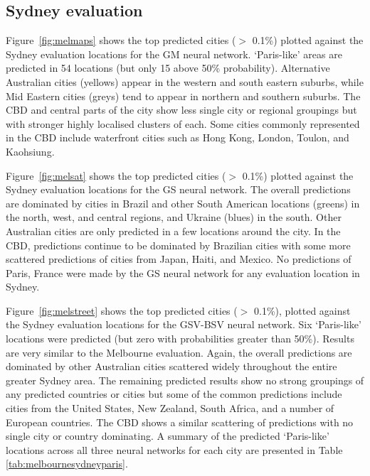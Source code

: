 \documentclass[Crown,sageh,times]{sagej}
\begin{document}
\subsection{Sydney evaluation} 

Figure~\ref{fig:melmaps} shows the top predicted cities ($>$ 0.1\%) plotted against the Sydney evaluation locations for the GM neural network. `Paris-like' areas are predicted in 54 locations (but only 15 above 50\% probability).  Alternative Australian cities (yellows) appear in the western and south eastern suburbs, while Mid Eastern cities (greys) tend to appear in northern and southern suburbs. The CBD and central parts of the city show less single city or regional groupings but with stronger highly localised clusters of each. Some cities commonly represented in the CBD include waterfront cities such as Hong Kong, London, Toulon, and Kaohsiung. 

Figure~\ref{fig:melsat} shows the top predicted cities ($>$ 0.1\%) plotted against the Sydney evaluation locations for the GS neural network. The overall predictions are dominated by cities in Brazil and other South American locations (greens) in the north, west, and central regions, and Ukraine (blues) in the south. Other Australian cities are only predicted in a few locations around the city. In the CBD, predictions continue to be dominated by Brazilian cities with some more scattered predictions of cities from Japan, Haiti, and Mexico. No predictions of Paris, France were made by the GS neural network for any evaluation location in Sydney.

Figure~\ref{fig:melstreet} shows the top predicted cities ($>$ 0.1\%), plotted against the Sydney evaluation locations for the GSV-BSV neural network. Six `Paris-like' locations were predicted (but zero with probabilities greater than 50\%). Results are very similar to the Melbourne evaluation. Again, the overall predictions are dominated by other Australian cities scattered widely throughout the entire greater Sydney area. The remaining predicted results show no strong groupings of any predicted countries or cities but some of the common predictions include cities from the United States, New Zealand, South Africa, and a number of European countries. The CBD shows a similar scattering of predictions with no single city or country dominating. A summary of the predicted `Paris-like' locations across all three neural networks for each city are presented in Table \ref{tab:melbournesydneyparis}.
\end{document}
